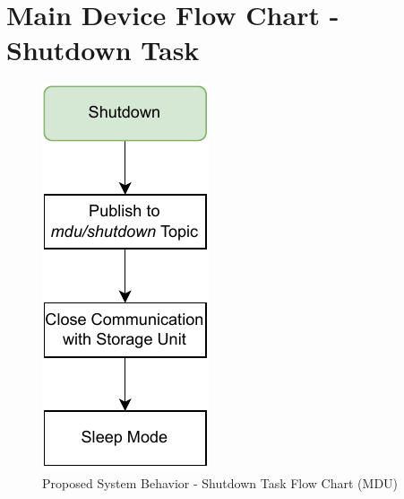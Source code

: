 
\chapter{Main Device Flow Chart - Shutdown Task} %

\label{AppendixD}

\begin{figure}[H]
    \centering
    \includegraphics[scale=1]{appendices/assets/MDU_SHUTDOWN.pdf}
    \caption{Proposed System Behavior - Shutdown Task Flow Chart (MDU)}
    \label{fig:MDU_SHUTDOWN}
\end{figure}

